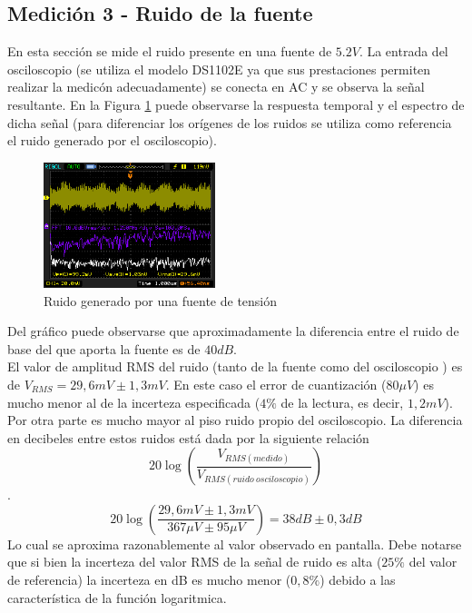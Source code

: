 \documentclass[a4paper,10pt]{article}
\begin{document}
	\subsection{Medición 3 - Ruido de la fuente}
	\indent En esta secci\'on se mide el ruido presente en una fuente de $5.2V$.
	La entrada del osciloscopio (se utiliza el modelo DS1102E ya que sus 
	prestaciones permiten realizar la medic\'on adecuadamente) se conecta en AC 
	y se observa la se\~nal resultante. En la Figura \ref{img008} puede 
	observarse la respuesta temporal y el espectro de dicha se\~nal (para 
	diferenciar los or\'igenes de los ruidos se utiliza como referencia el 
	ruido generado por el osciloscopio).

		\begin{figure}[!htb]
			\centering
			\includegraphics[width=5cm]
			{Imagenes/RuidoFuente.png}
			\caption{Ruido generado por una fuente de tensi\'on}
			\label{img008}
		\end{figure}
	\indent Del gr\'afico puede observarse que aproximadamente la diferencia 
	entre el ruido de base del que aporta la fuente es de $40dB$.\\ 
	El valor de amplitud RMS del ruido (tanto de la fuente como del osciloscopio
	) es de $V_{RMS}=29,6mV \pm 1,3mV $. En este caso el error de cuantizaci\'on
	($80\mu V$) es mucho menor al de la incerteza especificada ($4\%$ de la 
	lectura, es decir, $1,2mV$). Por otra parte es mucho mayor al piso ruido 
	propio del osciloscopio. La diferencia en decibeles entre estos ruidos 
	est\'a dada por la siguiente relaci\'on 
	$$20\log(\frac{V_{RMS(medido)}}{V_{RMS(ruido~ osciloscopio)}})$$.
	$$20\log(\frac{29,6mV \pm 1,3mV}{367\mu V \pm95\mu V})=38dB \pm 0,3dB$$
	\indent Lo cual se aproxima razonablemente al valor observado en pantalla. 
	Debe notarse que si bien la incerteza del valor RMS de la se\~nal de ruido 
	es alta ($25\%$ del valor de referencia) la incerteza en dB es mucho menor 
	($0,8\%$) debido a las caracter\'istica de la funci\'on logaritmica. 
\end{document}
